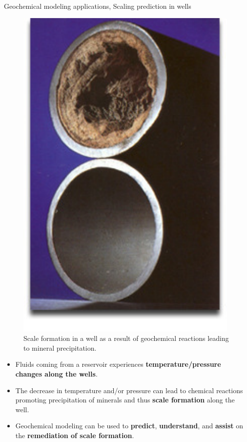 %
\begin{frame}{Geochemical modeling applications, Scaling prediction in wells}
%
\lcol
%
\vskip 20pt
\begin{figure}
\centering
\includegraphics[height=0.6\textheight]{figures/applications/scaling-calcium-strontium-barium}
\caption*{Scale formation in a well as a result of geochemical reactions leading
to mineral precipitation.}
\end{figure}
%
\pause
\rcol
\vskip -20pt
\begin{itemize}[<+->]
\item Fluids coming from a reservoir experiences \textbf{temperature\slash pressure
changes along the wells}.
\item The decrease in temperature and/or pressure can lead to chemical reactions 
promoting precipitation of minerals and thus \textbf{scale formation} along the well.
\item Geochemical modeling can be used to \textbf{predict}, \textbf{understand},
and \textbf{assist }on the \textbf{\alert{\textbf{remediation of scale formation}}}.
\end{itemize}
\ecol
%
\end{frame}


